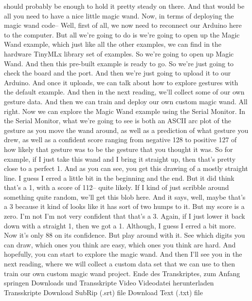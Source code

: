     should probably be enough to hold it pretty steady on there.
    And that would be all you need to have a nice little magic wand.
    Now, in terms of deploying the magic wand code--
    Well, first of all, we now need to reconnect our Arduino here
    to the computer.
    But all we're going to do is we're going to open up the Magic Wand
    example, which just like all the other examples,
    we can find in the hardware TinyMLx library set of examples.
    So we're going to open up Magic Wand.
    And then this pre-built example is ready to go.
    So we're just going to check the board and the port.
    And then we're just going to upload it to our Arduino.
    And once it uploads, we can talk about how to explore gestures
    with the default example.
    And then in the next reading, we'll collect some of our own gesture data.
    And then we can train and deploy our own custom magic wand.
    All right.
    Now we can explore the Magic Wand example using the Serial Monitor.
    In the Serial Monitor, what we're going to see
    is both an ASCII arc plot of the gesture as you move the wand around,
    as well as a prediction of what gesture you drew,
    as well as a confident score ranging from negative 128
    to positive 127 of how likely that gesture was to be the gesture that you
    thought it was.
    So for example, if I just take this wand and I bring it straight up,
    then that's pretty close to a perfect 1.
    And as you can see, you get this drawing of a mostly straight line.
    I guess I erred a little bit in the beginning and the end.
    But it did think that's a 1, with a score of 112--
    quite likely.
    If I kind of just scribble around something quite random,
    we'll get this blob here.
    And it says, well, maybe that's a 3 because it kind of looks
    like it has sort of two humps to it.
    But my score is a zero.
    I'm not I'm not very confident that that's a 3.
    Again, if I just lower it back down with a straight 1, then we got a 1.
    Although, I guess I erred a bit more.
    Now it's only 88 on its confidence.
    But play around with it.
    See which digits you can draw, which ones you think are easy,
    which ones you think are hard.
    And hopefully, you can start to explore the magic wand.
    And then I'll see you in the next reading, where
    we will collect a custom data set that we can use to then train our own custom
    magic wand project.
    Ende des Transkriptes, zum Anfang springen
    Downloads und Transskripte
    Video
    Videodatei herunterladen
    Transskripte
    Download SubRip (.srt) file
    Download Text (.txt) file

